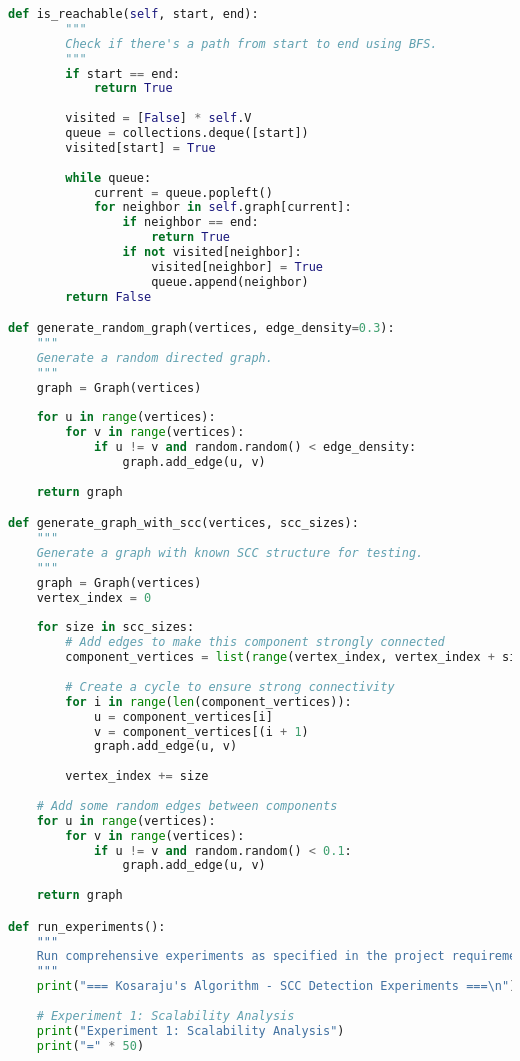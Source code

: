 \documentclass{book}
\theoremstyle{definition}
\begin{document}
\begin{lstlisting}[language=Python, caption=Graph Class Structure]
    def is_reachable(self, start, end):
        """
        Check if there's a path from start to end using BFS.
        """
        if start == end:
            return True
            
        visited = [False] * self.V
        queue = collections.deque([start])
        visited[start] = True
        
        while queue:
            current = queue.popleft()
            for neighbor in self.graph[current]:
                if neighbor == end:
                    return True
                if not visited[neighbor]:
                    visited[neighbor] = True
                    queue.append(neighbor)
        return False

def generate_random_graph(vertices, edge_density=0.3):
    """
    Generate a random directed graph.
    """
    graph = Graph(vertices)
    
    for u in range(vertices):
        for v in range(vertices):
            if u != v and random.random() < edge_density:
                graph.add_edge(u, v)
    
    return graph

def generate_graph_with_scc(vertices, scc_sizes):
    """
    Generate a graph with known SCC structure for testing.
    """
    graph = Graph(vertices)
    vertex_index = 0
    
    for size in scc_sizes:
        # Add edges to make this component strongly connected
        component_vertices = list(range(vertex_index, vertex_index + size))
        
        # Create a cycle to ensure strong connectivity
        for i in range(len(component_vertices)):
            u = component_vertices[i]
            v = component_vertices[(i + 1) 
            graph.add_edge(u, v)
        
        vertex_index += size
    
    # Add some random edges between components
    for u in range(vertices):
        for v in range(vertices):
            if u != v and random.random() < 0.1:
                graph.add_edge(u, v)
    
    return graph

def run_experiments():
    """
    Run comprehensive experiments as specified in the project requirements.
    """
    print("=== Kosaraju's Algorithm - SCC Detection Experiments ===\n")
    
    # Experiment 1: Scalability Analysis
    print("Experiment 1: Scalability Analysis")
    print("=" * 50)
    

\end{lstlisting}
\end{document}
